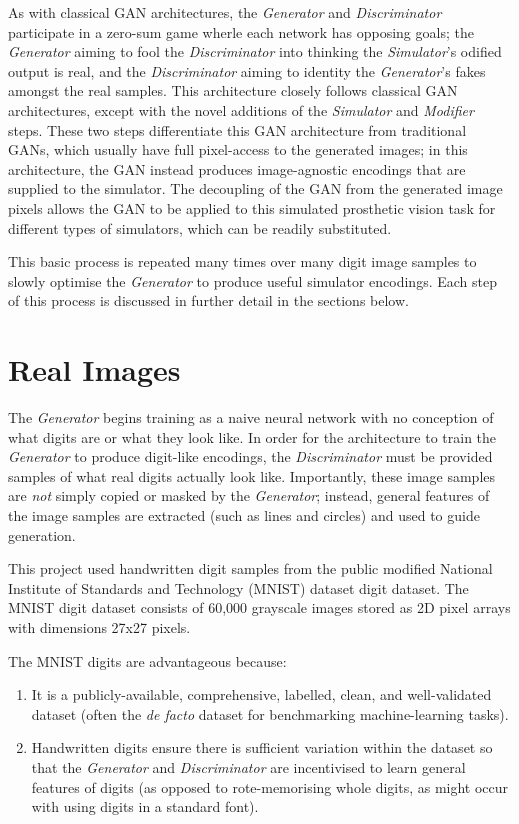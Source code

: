 \documentclass[a4paper,11pt,openany]{book}
\begin{document}
As with classical GAN architectures, the \emph{Generator} and \emph{Discriminator} participate in a zero-sum game wherle each network has opposing goals; the \emph{Generator} aiming to fool the \emph{Discriminator} into thinking the \emph{Simulator}'s odified output is real, and the \emph{Discriminator} aiming to identity the \emph{Generator}'s fakes amongst the real samples.
This architecture closely follows classical GAN architectures, except with the novel additions of the \emph{Simulator} and \emph{Modifier} steps.
These two steps differentiate this GAN architecture from traditional GANs, which usually have full pixel-access to the generated images; in this architecture, the GAN instead produces image-agnostic encodings that are supplied to the simulator.
The decoupling of the GAN from the generated image pixels allows the GAN to be applied to this simulated prosthetic vision task for different types of simulators, which can be readily substituted.

This basic process is repeated many times over many digit image samples to slowly optimise the \emph{Generator} to produce useful simulator encodings.
Each step of this process is discussed in further detail in the sections below.

\section*{Real Images}
\label{sec:orgfdcb8b8}

The \emph{Generator} begins training as a naive neural network with no conception of what digits are or what they look like.
In order for the architecture to train the \emph{Generator} to produce digit-like encodings, the \emph{Discriminator} must be provided samples of what real digits actually look like.
Importantly, these image samples are \emph{not} simply copied or masked by the \emph{Generator}; instead, general features of the image samples are extracted (such as lines and circles) and used to guide generation.

This project used handwritten digit samples from the public modified National Institute of Standards and Technology (MNIST) dataset digit dataset. \cite{Lecun1998}
The MNIST digit dataset consists of 60,000 grayscale images stored as 2D pixel arrays with dimensions 27x27 pixels.

The MNIST digits are advantageous because:
\begin{enumerate}
\item It is a publicly-available, comprehensive, labelled, clean, and well-validated dataset (often the \emph{de facto} dataset for benchmarking machine-learning tasks).
\item Handwritten digits ensure there is sufficient variation within the dataset so that the \emph{Generator} and \emph{Discriminator} are incentivised to learn general features of digits (as opposed to rote-memorising whole digits, as might occur with using digits in a standard font).
\end{enumerate}
\end{document}
